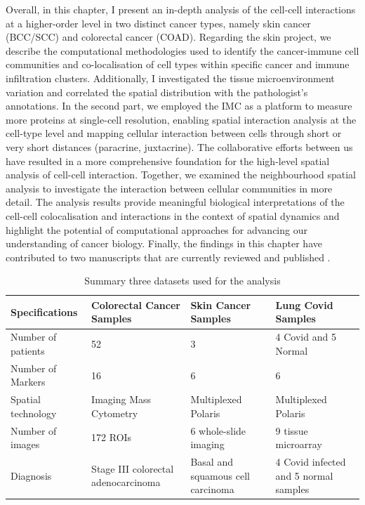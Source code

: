 Overall, in this chapter, I present an in-depth analysis of the cell-cell interactions at a higher-order level in two distinct cancer types, namely skin cancer (BCC/SCC) and colorectal cancer (COAD). Regarding the skin project, we describe the computational methodologies used to identify the cancer-immune cell communities and co-localisation of cell types within specific cancer and immune infiltration clusters. Additionally, I investigated the tissue microenvironment variation and correlated the spatial distribution with the pathologist's annotations. In the second part, we employed the IMC as a platform to measure more proteins at single-cell resolution, enabling spatial interaction analysis at the cell-type level and mapping cellular interaction between cells through short or very short distances (paracrine, juxtacrine). The collaborative efforts between us have resulted in a more comprehensive foundation for the high-level spatial analysis of cell-cell interaction. Together, we examined the neighbourhood spatial analysis to investigate the interaction between cellular communities in more detail. The analysis results provide meaningful biological interpretations of the cell-cell colocalisation and interactions in the context of spatial dynamics and highlight the potential of computational approaches for advancing our understanding of cancer biology. Finally, the findings in this chapter have contributed to two manuscripts that are currently reviewed and published \cite{grice2023comparative, Tan2023multiomics}.  

\begin{table}[ht]
\centering
\caption{Summary three datasets used for the analysis}
\begin{tabular}{||P{4cm} || P{3cm} || P{3cm} || P{3cm} || } 
 \hline
 Specifications & Colorectal Cancer Samples & Skin Cancer Samples  & Lung Covid Samples \\ [0.33ex] 
 \hline\hline
 Number of patients & 52 & 3 & 4 Covid and 5 Normal \\ 
 \hline
 Number of Markers & 16  & 6  & 6 \\ 
 \hline
 Spatial technology & Imaging Mass Cytometry & Multiplexed Polaris & Multiplexed Polaris  \\ 
 \hline
 Number of images & 172 ROIs &  6 whole-slide imaging &  9 tissue microarray \\
 \hline
 Diagnosis & Stage III colorectal adenocarcinoma & Basal and squamous cell carcinoma & 4 Covid infected and 5 normal samples  \\ [1ex] 
 \hline
\end{tabular}
\label{table:Chapt3_DataInfor}
\end{table}
